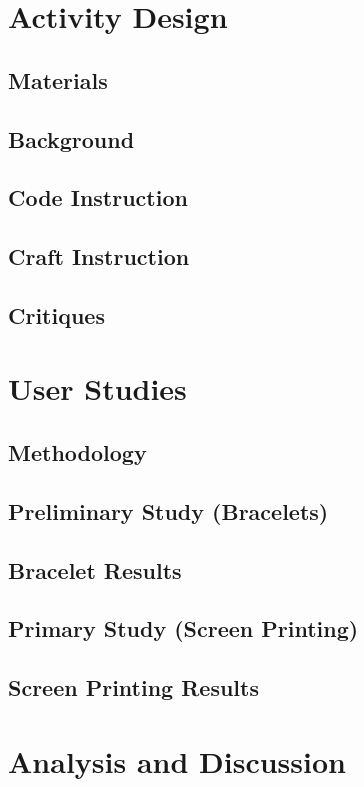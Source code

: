 \documentclass{sigchi}
\begin{document}
\subsection{}
\section{Activity Design}
\subsection{Materials}
\subsection{Background}
\subsection{Code Instruction}
\subsection{Craft Instruction}
\subsection{Critiques}

\section{User Studies}
	\subsection{Methodology}
	\subsection{Preliminary Study (Bracelets)}
	\subsection{Bracelet Results}
	\subsection{Primary Study (Screen Printing)}
	\subsection{Screen Printing Results}
	
	
\section{Analysis and Discussion}
\end{document}
